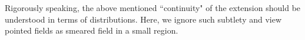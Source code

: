\documentclass[12pt,b5paper,notitlepage]{article}
\theoremstyle{definition}
\newtheorem{rem}[df]{Remark}
\theoremstyle{plain}
\newcommand{\mc}{\mathcal}
\newcommand{\wtd}{\widetilde}
\newcommand{\sgm}{\varsigma}
\newcommand{\Rbb}{\mathbb R}
\numberwithin{equation}{section}
\begin{document}
Rigorously speaking, the above mentioned ``continuity" of the extension should be understood in terms of distributions. Here, we ignore such subtlety and view pointed fields as smeared field in a small region.

\subsection{}

\end{document}
